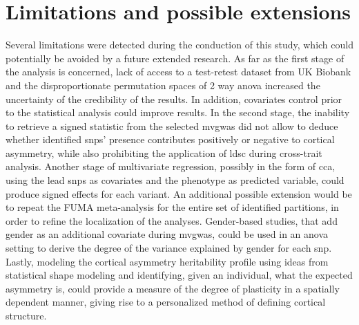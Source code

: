 \section{Limitations and possible extensions}
Several limitations were detected during the conduction of this study, which could potentially be avoided by a future extended research. As far as the first stage of the analysis is concerned, lack of access to a test-retest dataset from UK Biobank and the disproportionate permutation spaces of 2 way \ac{anova} increased the uncertainty of the credibility of the results. In addition, covariates control prior to the statistical analysis could improve results. In the second stage, the inability to retrieve a signed statistic from the selected \ac{mvgwas} did not allow to deduce whether identified \acp{snp}' presence contributes positively or negative to cortical asymmetry, while also prohibiting the application of \ac{ldsc} during cross-trait analysis. Another stage of multivariate regression, possibly in the form of \ac{cca}, using the lead \acp{snp} as covariates and the phenotype as predicted variable, could produce signed effects for each variant. An additional possible extension would be to repeat the FUMA meta-analysis for the entire set of identified partitions, in order to refine the localization of the analyses. Gender-based studies, that add gender as an additional covariate during  \ac{mvgwas}, could be used in an \ac{anova} setting to derive the degree of the variance explained by gender for each \ac{snp}. Lastly, modeling the cortical asymmetry heritability profile using ideas from statistical shape modeling and identifying, given an individual, what the expected asymmetry is, could provide a measure of the degree of plasticity in a spatially dependent manner, giving rise to a personalized method of defining cortical structure.

